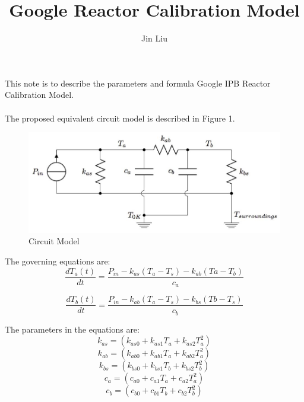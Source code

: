 \documentclass{article}
\title{Google Reactor Calibration Model}
\author{Jin Liu}
\begin{document}
\maketitle

This note is to describe the parameters and formula Google IPB Reactor Calibration Model.\\
\\

The proposed equivalent circuit model is described in Figure 1.\\

\begin{figure}
[h]
\begin{center}
\includegraphics[scale=1]{formula1.jpg} 
\caption{Circuit Model}%
\end{center}
\end{figure} 
The governing equations are:
\begin{equation}
\frac{dT_{a}(t)}{dt}=\frac{P_{in}-k_{as}(T_{a}-T_{s})-k_{ab}(T{a}-T_{b})}{c_{a}}\label{1}%
\end{equation} 

\begin{equation}
\frac{dT_{b}(t)}{dt}=\frac{P_{in}-k_{ab}(T_{a}-T_{s})-k_{bs}(T{b}-T_{s})}{c_{b}}\label{1}%
\end{equation} 

The parameters in the equations are:
\begin{equation}
k_{as}=(k_{as0}+k_{as1}T_{a}+k_{as2}T_{a}^{2})\label{1}%
\end{equation}  
\begin{equation}
k_{ab}=(k_{ab0}+k_{ab1}T_{a}+k_{ab2}T_{a}^{2})
\end{equation}  
\begin{equation}
k_{bs}=(k_{bs0}+k_{bs1}T_{b}+k_{bs2}T_{b}^{2})
\end{equation}  
\begin{equation}
c_{a}=(c_{a0}+c_{a1}T_{a}+c_{a2}T_{a}^{2})
\end{equation}  
\begin{equation}
c_{b}=(c_{b0}+c_{b1}T_{b}+c_{b2}T_{b}^{2})
\end{equation} 
\end{document}
